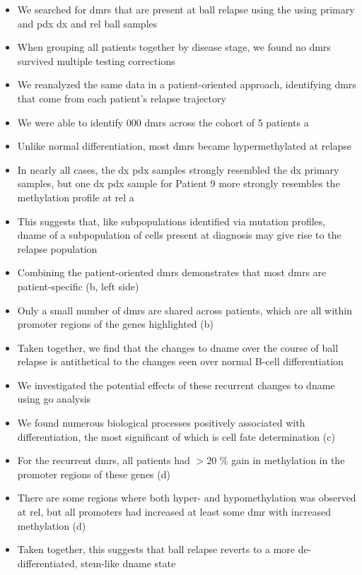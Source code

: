 \begin{itemize}
  \item We searched for \glspl{dmr} that are present at \gls{ball} relapse using the using primary and \gls{pdx} \gls{dx} and \gls{rel} \gls{ball} samples
  \item When grouping all patients together by disease stage, we found no \glspl{dmr} survived multiple testing corrections
  \item We reanalyzed the same data in a patient-oriented approach, identifying \glspl{dmr} that come from each patient's relapse trajectory
  \item We were able to identify  000 \glspl{dmr} across the cohort of 5 patients a
  \item Unlike normal differentiation, most \glspl{dmr} became hypermethylated at relapse
  \item In nearly all cases, the \gls{dx} \gls{pdx} samples strongly resembled the \gls{dx} primary samples, but one \gls{dx} \gls{pdx} sample for Patient 9 more strongly resembles the methylation profile at \gls{rel} a
  \item This suggests that, like subpopulations identified via mutation profiles, \gls{dname} of a subpopulation of cells present at diagnosis may give rise to the relapse population
  \item Combining the patient-oriented \glspl{dmr} demonstrates that most \glspl{dmr} are patient-specific (b, left side)
  \item Only a small number of \glspl{dmr} are shared across patients, which are all within promoter regions of the genes highlighted (b)
  \item Taken together, we find that the changes to \gls{dname} over the course of \gls{ball} relapse is antithetical to the changes seen over normal B-cell differentiation
\end{itemize}

\begin{itemize}
  \item We investigated the potential effects of these recurrent changes to \gls{dname} using \gls{go} analysis
  \item We found numerous biological processes positively associated with differentiation, the most significant of which is cell fate determination (c)
  \item For the recurrent \glspl{dmr}, all patients had $> 20$ \% gain in methylation in the promoter regions of these genes (d)
  \item There are some regions where both hyper- and hypomethylation was observed at \gls{rel}, but all promoters had increased at least some \gls{dmr} with increased methylation (d)
  \item Taken together, this suggests that \gls{ball} relapse reverts to a more de-differentiated, stem-like \gls{dname} state
\end{itemize}

